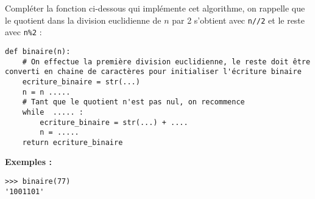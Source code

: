 \documentclass[12pt,a4paper]{article}
\begin{document}
Compléter la fonction ci-dessous qui implémente cet algorithme, on rappelle que le quotient dans la division euclidienne de $n$ par 2 s'obtient avec {\tt n//2} et le reste avec {\tt n\%2} :
\begin{lstlisting}
def binaire(n):
    # On effectue la première division euclidienne, le reste doit être converti en chaine de caractères pour initialiser l'écriture binaire
    ecriture_binaire = str(...)
    n = n .....
    # Tant que le quotient n'est pas nul, on recommence
    while  ..... :
        ecriture_binaire = str(...) + ....
        n = .....
    return ecriture_binaire
\end{lstlisting}

\textbf{Exemples : }
\begin{lstlisting}
>>> binaire(77)
'1001101'
\end{lstlisting} 
\end{document}
